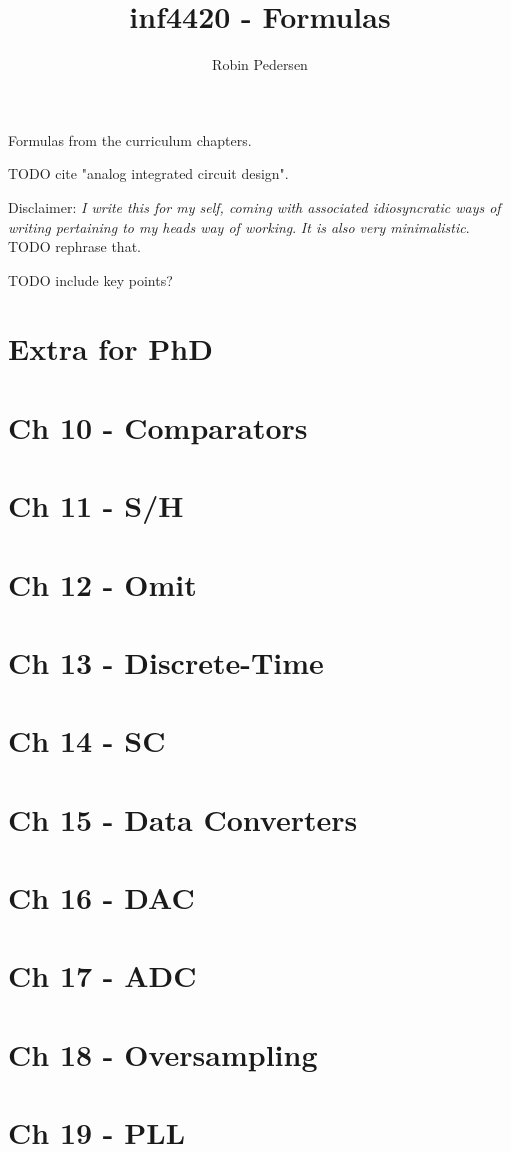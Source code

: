 \documentclass[a4paper,twocolumn]{article}
\begin{document}
  \title{inf4420 - Formulas}
  \author{Robin Pedersen}
  \maketitle

  Formulas from the curriculum chapters.

  TODO cite "analog integrated circuit design".

  Disclaimer: \emph{I write this for my self, coming with associated
  idiosyncratic ways of writing pertaining to my heads way of working}.
  \emph{It is also very minimalistic}.
  TODO rephrase that.

  TODO include key points?

  \section{Extra for PhD}
    
  \section{Ch 10 - Comparators}
    
  \section{Ch 11 - S/H}
    
  \section{Ch 12 - Omit}
  \section{Ch 13 - Discrete-Time}
    
  \section{Ch 14 - SC}
    
  \section{Ch 15 - Data Converters}
    
  \section{Ch 16 - DAC}
    
  \section{Ch 17 - ADC}
    
  \section{Ch 18 - Oversampling}
    
  \section{Ch 19 - PLL}
    
\end{document}

